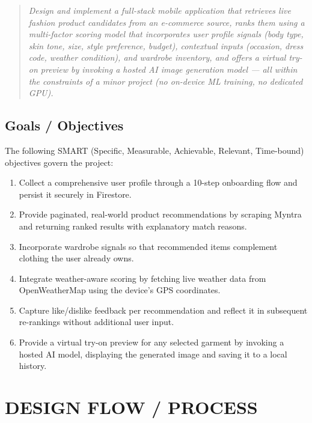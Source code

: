 \documentclass[12pt,a4paper]{report}
\begin{document}
\begin{quote}
\textit{Design and implement a full-stack mobile application that retrieves live fashion
product candidates from an e-commerce source, ranks them using a multi-factor scoring
model that incorporates user profile signals (body type, skin tone, size, style preference,
budget), contextual inputs (occasion, dress code, weather condition), and wardrobe
inventory, and offers a virtual try-on preview by invoking a hosted AI image generation
model --- all within the constraints of a minor project (no on-device ML training,
no dedicated GPU).}
\end{quote}

\section{Goals / Objectives}

The following SMART (Specific, Measurable, Achievable, Relevant, Time-bound) objectives govern the project:

\begin{enumerate}
  \item Collect a comprehensive user profile through a 10-step onboarding flow and persist it securely in Firestore.
  \item Provide paginated, real-world product recommendations by scraping Myntra and returning ranked results with explanatory match reasons.
  \item Incorporate wardrobe signals so that recommended items complement clothing the user already owns.
  \item Integrate weather-aware scoring by fetching live weather data from OpenWeatherMap using the device's GPS coordinates.
  \item Capture like/dislike feedback per recommendation and reflect it in subsequent re-rankings without additional user input.
  \item Provide a virtual try-on preview for any selected garment by invoking a hosted AI model, displaying the generated image and saving it to a local history.
\end{enumerate}

\chapter{DESIGN FLOW / PROCESS}
\end{document}
